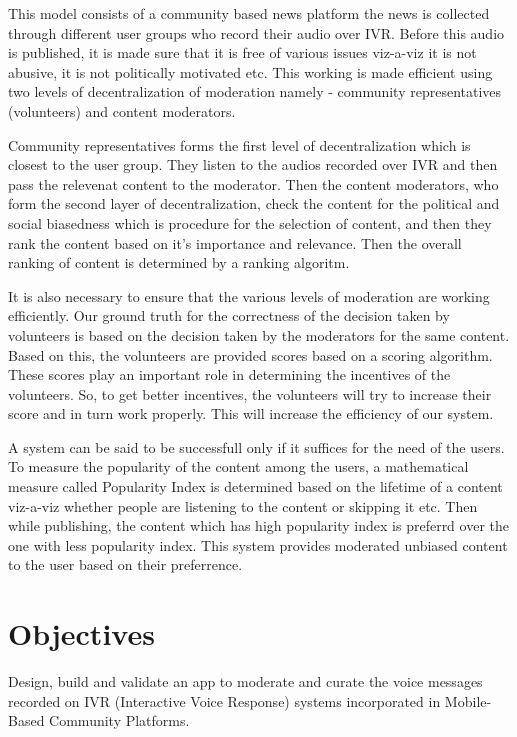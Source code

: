 \documentclass[11pt]{article}
\begin{document}
    
    This model consists of a community based news platform the news is collected through different user groups who record their audio over IVR. Before this audio is published, it is made sure that it is free of various issues viz-a-viz it is not abusive, it is not politically motivated etc. This working is made efficient using two levels of decentralization of moderation namely - community representatives (volunteers) and content moderators.

Community representatives forms the first level of decentralization which is closest to the user group. They listen to the audios recorded over IVR and then pass the relevenat content to the moderator. Then the content moderators, who form the second layer of decentralization, check the content for the political and social biasedness which is procedure for the selection of content, and then they rank the content based on it's importance and relevance. Then the overall ranking of content is determined by a ranking algoritm.

It is also necessary to ensure that the various levels of moderation are working efficiently. Our ground truth for the correctness of the decision taken by volunteers is based on the decision taken by the moderators for the same content. Based on this, the volunteers are provided scores based on a scoring algorithm. These scores play an important role in determining the incentives of the volunteers. So, to get better incentives, the volunteers will try to increase their score and in turn work properly. This will increase the efficiency of our system.

A system can be said to be successfull only if it suffices for the need of the users. To measure the popularity of the content among the users, a mathematical measure called Popularity Index is determined based on the lifetime of a content viz-a-viz whether people are listening to the content or skipping it etc. Then while publishing, the content which has high popularity index is preferrd over the one with less popularity index. This system provides moderated unbiased content to the user based on their preferrence.
    

	\section{Objectives}
	Design, build and validate an app to moderate and curate the voice messages recorded on IVR (Interactive Voice Response) systems incorporated in Mobile-Based Community Platforms.
\end{document}
